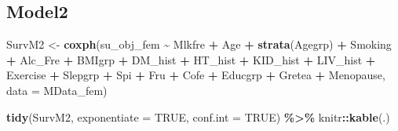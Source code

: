 \documentclass[
]{article}
\newenvironment{Shaded}{\begin{snugshade}}{\end{snugshade}}
\newcommand{\DataTypeTok}[1]{\textcolor[rgb]{0.13,0.29,0.53}{#1}}
\newcommand{\KeywordTok}[1]{\textcolor[rgb]{0.13,0.29,0.53}{\textbf{#1}}}
\newcommand{\NormalTok}[1]{#1}
\newcommand{\OperatorTok}[1]{\textcolor[rgb]{0.81,0.36,0.00}{\textbf{#1}}}
\newcommand{\OtherTok}[1]{\textcolor[rgb]{0.56,0.35,0.01}{#1}}
\newcommand{\StringTok}[1]{\textcolor[rgb]{0.31,0.60,0.02}{#1}}
\begin{document}
\hypertarget{model2-8}{%
\subsection{Model2}\label{model2-8}}

\begin{Shaded}
\begin{Highlighting}[]
\NormalTok{SurvM2 \textless{}{-}}\StringTok{  }\KeywordTok{coxph}\NormalTok{(su\_obj\_fem }\OperatorTok{\textasciitilde{}}\StringTok{ }\NormalTok{Mlkfre }\OperatorTok{+}\StringTok{ }\NormalTok{Age }\OperatorTok{+}\StringTok{ }\KeywordTok{strata}\NormalTok{(Agegrp) }\OperatorTok{+}\StringTok{ }\NormalTok{Smoking }\OperatorTok{+}\StringTok{ }\NormalTok{Alc\_Fre }\OperatorTok{+}\StringTok{ }
\StringTok{                   }\NormalTok{BMIgrp }\OperatorTok{+}\StringTok{ }\NormalTok{DM\_hist }\OperatorTok{+}\StringTok{ }\NormalTok{HT\_hist }\OperatorTok{+}\StringTok{ }\NormalTok{KID\_hist }\OperatorTok{+}\StringTok{ }\NormalTok{LIV\_hist }\OperatorTok{+}\StringTok{ }\NormalTok{Exercise }\OperatorTok{+}\StringTok{ }
\StringTok{                   }\NormalTok{Slepgrp }\OperatorTok{+}\StringTok{ }\NormalTok{Spi }\OperatorTok{+}\StringTok{ }\NormalTok{Fru }\OperatorTok{+}\StringTok{ }\NormalTok{Cofe }\OperatorTok{+}\StringTok{ }\NormalTok{Educgrp }\OperatorTok{+}\StringTok{ }\NormalTok{Gretea }\OperatorTok{+}\StringTok{ }\NormalTok{Menopause, }
                 \DataTypeTok{data =}\NormalTok{ MData\_fem)}

\KeywordTok{tidy}\NormalTok{(SurvM2, }\DataTypeTok{exponentiate =} \OtherTok{TRUE}\NormalTok{, }\DataTypeTok{conf.int =} \OtherTok{TRUE}\NormalTok{) }\OperatorTok{\%\textgreater{}\%}\StringTok{ }
\StringTok{  }\NormalTok{knitr}\OperatorTok{::}\KeywordTok{kable}\NormalTok{(.)}
\end{Highlighting}
\end{Shaded}
\end{document}

